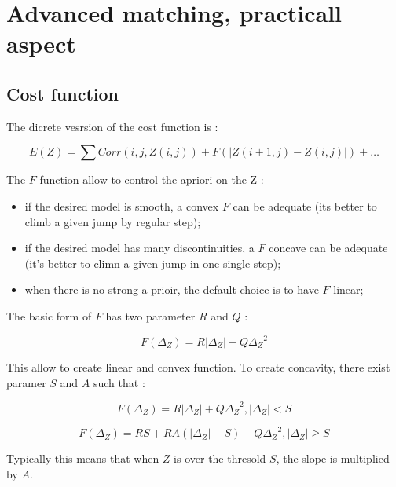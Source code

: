 \chapter{Advanced matching, practicall aspect}


\section{Cost function}


The dicrete vesrsion of the cost function is :


\begin{equation}
   E(Z) = \sum Corr(i,j,Z(i,j)) + F(|Z(i+1,j)-Z(i,j)|)  + \dots
\end{equation}

The $F$ function allow to control the apriori on the Z :
 
\begin{itemize}
   \item  if the desired model is smooth, a convex   $F$  can be adequate (its better to
          climb a given jump by regular step);

   \item  if  the desired model has many discontinuities, a $F$   concave can be adequate 
          (it's better to climn a given jump in one single step);

   \item when there is no strong a prioir, the  default choice is to have $F$ linear;

\end{itemize}


The basic form of $F$ has two parameter $R$ and $Q$ :

\begin{equation}
   F(\Delta_Z) =  R |\Delta_Z| + Q {\Delta_Z}^2
\end{equation}


This allow to create linear and convex function. To create concavity,
there exist paramer $S$  and  $A$ such that :

\begin{equation}
   F(\Delta_Z) =  R |\Delta_Z| + Q {\Delta_Z}^2 ,  |\Delta_Z| < S
\end{equation}

\begin{equation}
   F(\Delta_Z) =  R S +   R A (|\Delta_Z|-S)   + Q {\Delta_Z}^2 ,  |\Delta_Z| \geq  S
\end{equation}


Typically this means that when $Z$ is over the thresold $S$, the slope is multiplied by $A$.


